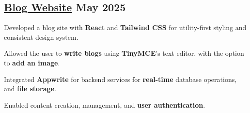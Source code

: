 \subsection{{\href{https://blog-site-thepratikguptaas-projects.vercel.app/}{Blog Website} \hfill May 2025}}
\begin{zitemize}
\item Developed a blog site with \textbf{React} and \textbf{Tailwind CSS}  for utility-first styling and consistent design system.
\item Allowed the user to \textbf{write blogs} using \textbf{TinyMCE}'s text editor, with the option to \textbf{add an image}.
\item Integrated \textbf{Appwrite} for backend services for \textbf{real-time} database operations, and \textbf{file storage}.
\item Enabled content creation, management, and \textbf{user authentication}.

\end{zitemize}
